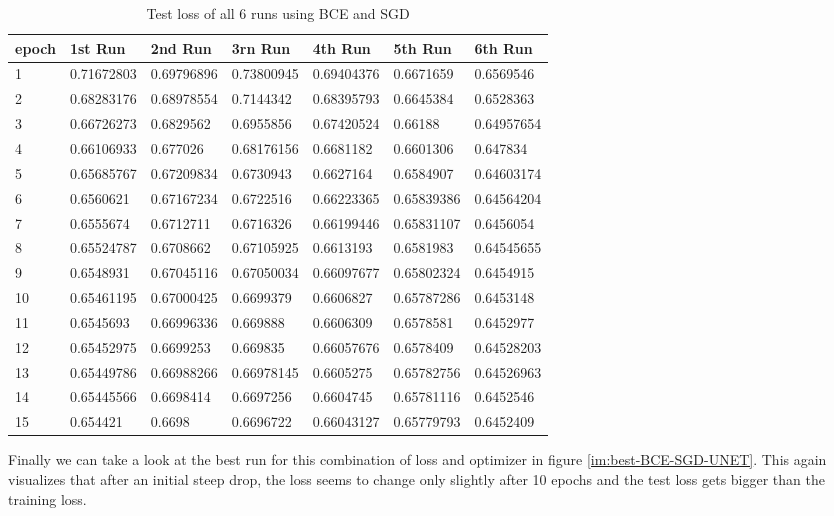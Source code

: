 \begin{table}[!ht]
    \centering
    \begin{tabular}{|l||l||l||l||l||l||l|}
    \hline
    epoch & 1st Run & 2nd Run & 3rn Run & 4th Run & 5th Run & 6th Run \\ \hline
        1 & 0.71672803 & 0.69796896 & 0.73800945 & 0.69404376 & 0.6671659 & 0.6569546 \\ \hline
        2 & 0.68283176 & 0.68978554 & 0.7144342 & 0.68395793 & 0.6645384 & 0.6528363 \\ \hline
        3 & 0.66726273 & 0.6829562 & 0.6955856 & 0.67420524 & 0.66188 & 0.64957654 \\ \hline
        4 & 0.66106933 & 0.677026 & 0.68176156 & 0.6681182 & 0.6601306 & 0.647834 \\ \hline
        5 & 0.65685767 & 0.67209834 & 0.6730943 & 0.6627164 & 0.6584907 & 0.64603174 \\ \hline
        6 & 0.6560621 & 0.67167234 & 0.6722516 & 0.66223365 & 0.65839386 & 0.64564204 \\ \hline
        7 & 0.6555674 & 0.6712711 & 0.6716326 & 0.66199446 & 0.65831107 & 0.6456054 \\ \hline
        8 & 0.65524787 & 0.6708662 & 0.67105925 & 0.6613193 & 0.6581983 & 0.64545655 \\ \hline
        9 & 0.6548931 & 0.67045116 & 0.67050034 & 0.66097677 & 0.65802324 & 0.6454915 \\ \hline
        10 & 0.65461195 & 0.67000425 & 0.6699379 & 0.6606827 & 0.65787286 & 0.6453148 \\ \hline
        11 & 0.6545693 & 0.66996336 & 0.669888 & 0.6606309 & 0.6578581 & 0.6452977 \\ \hline
        12 & 0.65452975 & 0.6699253 & 0.669835 & 0.66057676 & 0.6578409 & 0.64528203 \\ \hline
        13 & 0.65449786 & 0.66988266 & 0.66978145 & 0.6605275 & 0.65782756 & 0.64526963 \\ \hline
        14 & 0.65445566 & 0.6698414 & 0.6697256 & 0.6604745 & 0.65781116 & 0.6452546 \\ \hline
        15 & 0.654421 & 0.6698 & 0.6696722 & 0.66043127 & 0.65779793 & 0.6452409 \\ \hline
    \end{tabular}
    \caption{\label{tab:bce_sgd_test}Test loss of all 6 runs using BCE and SGD}
\end{table}

Finally we can take a look at the best run for this combination of loss and optimizer in figure
\ref{im:best-BCE-SGD-UNET}. This again visualizes that after an initial steep drop, the loss seems to
change only slightly after 10 epochs and the test loss gets bigger than the training loss.



